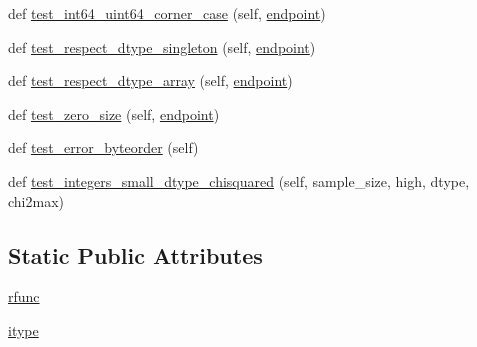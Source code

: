 \begin{DoxyCompactItemize}
\item 
def \hyperlink{classnumpy_1_1random_1_1tests_1_1test__generator__mt19937_1_1TestIntegers_aa215456a1a65b6db90436a4b4a5c9775}{test\+\_\+int64\+\_\+uint64\+\_\+corner\+\_\+case} (self, \hyperlink{namespacenumpy_1_1random_1_1tests_1_1test__generator__mt19937_a3cf8952087f960f78b86fcf9dc3f6a1e}{endpoint})
\item 
def \hyperlink{classnumpy_1_1random_1_1tests_1_1test__generator__mt19937_1_1TestIntegers_a6f6a3dd891f750f787bed959455bef91}{test\+\_\+respect\+\_\+dtype\+\_\+singleton} (self, \hyperlink{namespacenumpy_1_1random_1_1tests_1_1test__generator__mt19937_a3cf8952087f960f78b86fcf9dc3f6a1e}{endpoint})
\item 
def \hyperlink{classnumpy_1_1random_1_1tests_1_1test__generator__mt19937_1_1TestIntegers_ae1be28294a4701e1044d2cb81ff0ffc4}{test\+\_\+respect\+\_\+dtype\+\_\+array} (self, \hyperlink{namespacenumpy_1_1random_1_1tests_1_1test__generator__mt19937_a3cf8952087f960f78b86fcf9dc3f6a1e}{endpoint})
\item 
def \hyperlink{classnumpy_1_1random_1_1tests_1_1test__generator__mt19937_1_1TestIntegers_a51f1dec3707a4d124874bb16c365074d}{test\+\_\+zero\+\_\+size} (self, \hyperlink{namespacenumpy_1_1random_1_1tests_1_1test__generator__mt19937_a3cf8952087f960f78b86fcf9dc3f6a1e}{endpoint})
\item 
def \hyperlink{classnumpy_1_1random_1_1tests_1_1test__generator__mt19937_1_1TestIntegers_aef4c510a3750f444d909557970172f76}{test\+\_\+error\+\_\+byteorder} (self)
\item 
def \hyperlink{classnumpy_1_1random_1_1tests_1_1test__generator__mt19937_1_1TestIntegers_abf4e39eb01fb85cb2d1457832d2420a6}{test\+\_\+integers\+\_\+small\+\_\+dtype\+\_\+chisquared} (self, sample\+\_\+size, high, dtype, chi2max)
\end{DoxyCompactItemize}
\subsection*{Static Public Attributes}
\begin{DoxyCompactItemize}
\item 
\hyperlink{classnumpy_1_1random_1_1tests_1_1test__generator__mt19937_1_1TestIntegers_a6e0dfd06d7d41ada11a5f2d2ccf2cb85}{rfunc}
\item 
\hyperlink{classnumpy_1_1random_1_1tests_1_1test__generator__mt19937_1_1TestIntegers_a05e0c4d86072c5205fd55445b559d629}{itype}
\end{DoxyCompactItemize}


